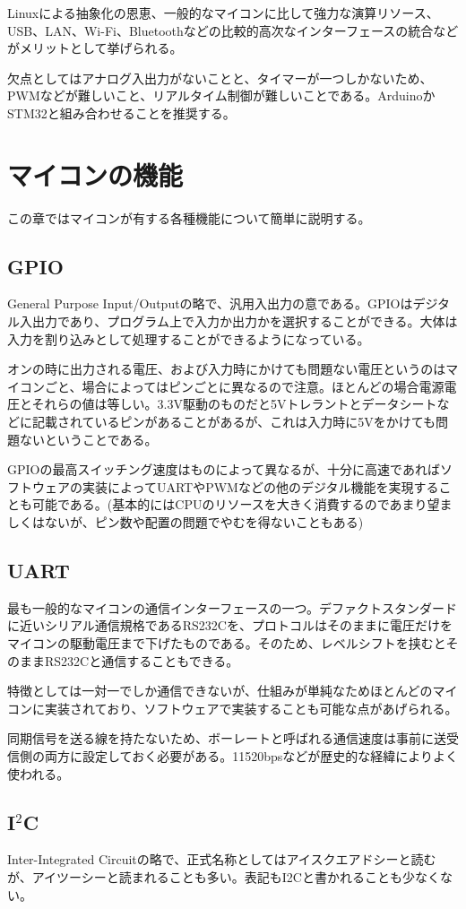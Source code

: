 \documentclass[a4paper,titlepage,here]{ujarticle}
\begin{document}
Linuxによる抽象化の恩恵、一般的なマイコンに比して強力な演算リソース、USB、LAN、Wi-Fi、Bluetoothなどの比較的高次なインターフェースの統合などがメリットとして挙げられる。

欠点としてはアナログ入出力がないことと、タイマーが一つしかないため、PWMなどが難しいこと、リアルタイム制御が難しいことである。ArduinoかSTM32と組み合わせることを推奨する。
\section{マイコンの機能}
この章ではマイコンが有する各種機能について簡単に説明する。
\subsection{GPIO}
General Purpose Input/Outputの略で、汎用入出力の意である。GPIOはデジタル入出力であり、プログラム上で入力か出力かを選択することができる。大体は入力を割り込みとして処理することができるようになっている。

オンの時に出力される電圧、および入力時にかけても問題ない電圧というのはマイコンごと、場合によってはピンごとに異なるので注意。ほとんどの場合電源電圧とそれらの値は等しい。3.3V駆動のものだと5Vトレラントとデータシートなどに記載されているピンがあることがあるが、これは入力時に5Vをかけても問題ないということである。

GPIOの最高スイッチング速度はものによって異なるが、十分に高速であればソフトウェアの実装によってUARTやPWMなどの他のデジタル機能を実現することも可能である。(基本的にはCPUのリソースを大きく消費するのであまり望ましくはないが、ピン数や配置の問題でやむを得ないこともある)
\subsection{UART}
最も一般的なマイコンの通信インターフェースの一つ。デファクトスタンダードに近いシリアル通信規格であるRS232Cを、プロトコルはそのままに電圧だけをマイコンの駆動電圧まで下げたものである。そのため、レベルシフトを挟むとそのままRS232Cと通信することもできる。

特徴としては一対一でしか通信できないが、仕組みが単純なためほとんどのマイコンに実装されており、ソフトウェアで実装することも可能な点があげられる。

同期信号を送る線を持たないため、ボーレートと呼ばれる通信速度は事前に送受信側の両方に設定しておく必要がある。11520bpsなどが歴史的な経緯によりよく使われる。
\subsection{I$^2$C}
Inter-Integrated Circuitの略で、正式名称としてはアイスクエアドシーと読むが、アイツーシーと読まれることも多い。表記もI2Cと書かれることも少なくない。
\end{document}
